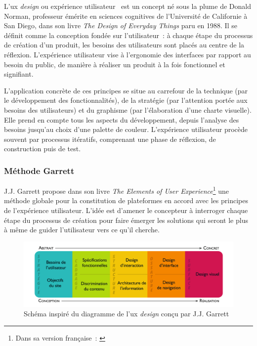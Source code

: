 \documentclass[a4paper,12pt,twoside]{book}
\newcommand{\g}[1]{\og#1~\fg}
\newcommand{\ux}{\gls{ux} \emph{design}\xspace}
\begin{document}
L'\ux ou \g{expérience utilisateur} est un concept né sous la plume de Donald Norman, professeur émérite en sciences cognitives de l'Université de Californie à San Diego, dans son livre \emph{The Design of Everyday Things} paru en 1988. Il se définit comme la conception fondée sur l'utilisateur~: à chaque étape du processus de création d'un produit, les besoins des utilisateurs sont placés au centre de la réflexion. L'expérience utilisateur vise à l'ergonomie des interfaces par rapport au besoin du public, de manière à réaliser un produit à la fois fonctionnel et signifiant.

L'application concrète de ces principes se situe au carrefour de la technique (par le développement des fonctionnalités), de la stratégie (par l'attention portée aux besoins des utilisateurs) et du graphisme (par l'élaboration d'une charte visuelle). Elle prend en compte tous les aspects du développement, depuis l'analyse des besoins jusqu'au choix d'une palette de couleur. L'expérience utilisateur procède souvent par processus itératifs, comprenant une phase de réflexion, de construction puis de test.

			\subsubsection{Méthode Garrett}
J.J. Garrett propose dans son livre \emph{The Elements of User Experience}\footnote{Dans sa version française~: \cite{garrettElementsExperienceUtilisateur2011}} une méthode globale pour la constitution de plateformes en accord avec les principes de l'expérience utilisateur. L'idée est d'amener le concepteur à interroger chaque étape du processus de création pour faire émerger les solutions qui seront le plus à même de guider l'utilisateur vers ce qu'il cherche.

\begin{figure}[h!]
	\centering
	\includegraphics[width=14cm]{Images/Etape-UX-design.png}
	\caption{Schéma inspiré du diagramme de l'\ux conçu par J.J. Garrett}
\end{figure}
\end{document}
